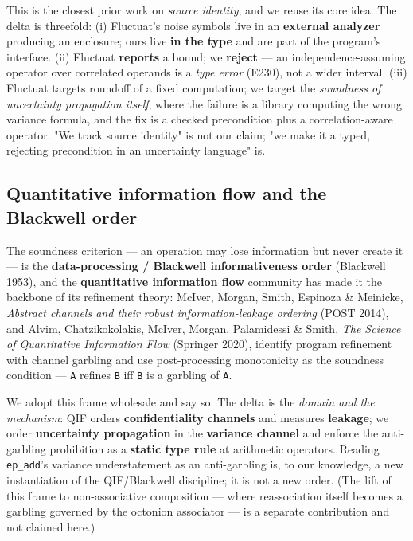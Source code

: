 \documentclass[sigplan,review,anonymous,10pt]{acmart}
\begin{document}
This is the closest prior work on \emph{source identity}, and we reuse its core idea. The delta is threefold: (i) Fluctuat's noise symbols live in an \textbf{external analyzer} producing an enclosure; ours live \textbf{in the type} and are part of the program's interface. (ii) Fluctuat \textbf{reports} a bound; we \textbf{reject} --- an independence-assuming operator over correlated operands is a \emph{type error} (E230), not a wider interval. (iii) Fluctuat targets roundoff of a fixed computation; we target the \emph{soundness of uncertainty propagation itself}, where the failure is a library computing the wrong variance formula, and the fix is a checked precondition plus a correlation-aware operator. "We track source identity" is not our claim; "we make it a typed, rejecting precondition in an uncertainty language" is.

\subsection{Quantitative information flow and the Blackwell order}

The soundness criterion --- an operation may lose information but never create it --- is the \textbf{data-processing / Blackwell informativeness order} (Blackwell 1953), and the \textbf{quantitative information flow} community has made it the backbone of its refinement theory: McIver, Morgan, Smith, Espinoza \& Meinicke, \emph{Abstract channels and their robust information-leakage ordering} (POST 2014), and Alvim, Chatzikokolakis, McIver, Morgan, Palamidessi \& Smith, \emph{The Science of Quantitative Information Flow} (Springer 2020), identify program refinement with channel garbling and use post-processing monotonicity as the soundness condition --- \texttt{A} refines \texttt{B} iff \texttt{B} is a garbling of \texttt{A}.

We adopt this frame wholesale and say so. The delta is the \emph{domain and the mechanism}: QIF orders \textbf{confidentiality channels} and measures \textbf{leakage}; we order \textbf{uncertainty propagation} in the \textbf{variance channel} and enforce the anti-garbling prohibition as a \textbf{static type rule} at arithmetic operators. Reading \texttt{ep\_add}'s variance understatement as an anti-garbling is, to our knowledge, a new instantiation of the QIF/Blackwell discipline; it is not a new order. (The lift of this frame to non-associative composition --- where reassociation itself becomes a garbling governed by the octonion associator --- is a separate contribution and not claimed here.)
\end{document}
